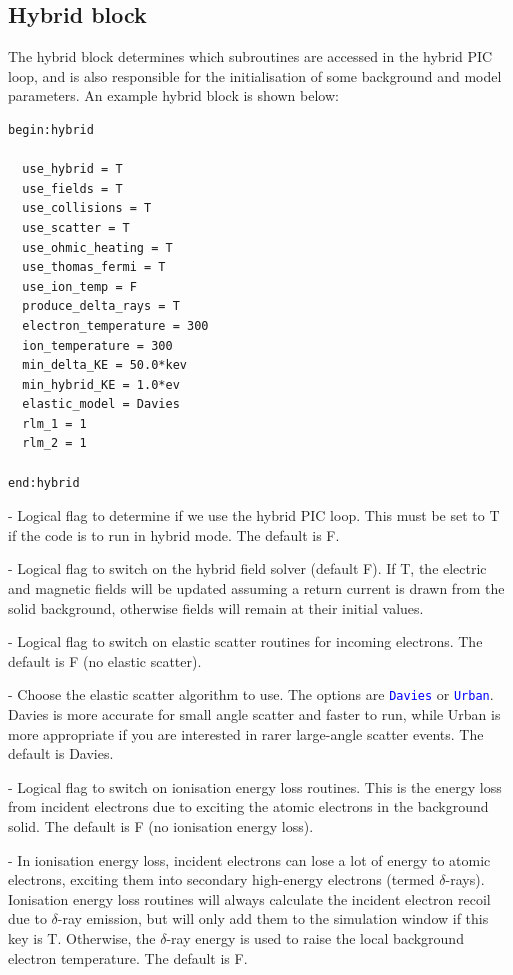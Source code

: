 \documentclass[12pt]{article}
\numberwithin{equation}{section}
\begin{document}
\subsection{Hybrid block} \label{sec:user:hybrid}

The hybrid block determines which subroutines are accessed in the hybrid PIC loop, and is also responsible for the initialisation of some background and model parameters. An example hybrid block is shown below:

\begin{lstlisting}[style=myInputDeck]
begin:hybrid

  use_hybrid = T
  use_fields = T
  use_collisions = T
  use_scatter = T
  use_ohmic_heating = T
  use_thomas_fermi = T
  use_ion_temp = F
  produce_delta_rays = T
  electron_temperature = 300 
  ion_temperature = 300      
  min_delta_KE = 50.0*kev
  min_hybrid_KE = 1.0*ev
  elastic_model = Davies
  rlm_1 = 1
  rlm_2 = 1         

end:hybrid
\end{lstlisting}

\bigskip {\large\textcolor{blue}{use\_hybrid}} - Logical flag to determine if we use the hybrid PIC loop. This must be set to T if the code is to run in hybrid mode. The default is F.

\bigskip {\large\textcolor{blue}{use\_fields}} - Logical flag to switch on the hybrid field solver (default F). If T, the electric and magnetic fields will be updated assuming a return current is drawn from the solid background, otherwise fields will remain at their initial values.

\bigskip {\large\textcolor{blue}{use\_scatter}} - Logical flag to switch on elastic scatter routines for incoming electrons. The default is F (no elastic scatter).

\bigskip {\large\textcolor{blue}{elastic\_model}} - Choose the elastic scatter algorithm to use. The options are \textcolor{blue}{\texttt{Davies}} or \textcolor{blue}{\texttt{Urban}}. Davies is more accurate for small angle scatter and faster to run, while Urban is more appropriate if you are interested in rarer large-angle scatter events. The default is Davies.

\bigskip {\large\textcolor{blue}{use\_collisions}} - Logical flag to switch on ionisation energy loss routines. This is the energy loss from incident electrons due to exciting the atomic electrons in the background solid. The default is F (no ionisation energy loss).

\bigskip {\large\textcolor{blue}{produce\_delta\_rays}} - In ionisation energy loss, incident electrons can lose a lot of energy to atomic electrons, exciting them into secondary high-energy electrons (termed $\delta$-rays). Ionisation energy loss routines will always calculate the incident electron recoil due to $\delta$-ray emission, but will only add them to the simulation window if this key is T. Otherwise, the $\delta$-ray energy is used to raise the local background electron temperature. The default is F.
\end{document}
